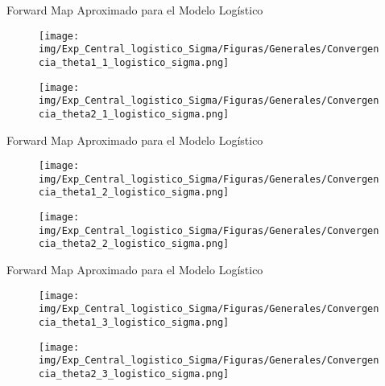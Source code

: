 \documentclass[10pt,aspectratio=169]{beamer}
\begin{document}
\begin{frame}{Forward Map Aproximado para el Modelo Logístico}
  \begin{figure}[H] 
    \centering 
    \texttt{[image: img/Exp\_Central\_logistico\_Sigma/Figuras/Generales/Convergencia\_theta1\_1\_logistico\_sigma.png]} 
  \end{figure} 
  \begin{figure}[H] 
    \centering 
    \texttt{[image: img/Exp\_Central\_logistico\_Sigma/Figuras/Generales/Convergencia\_theta2\_1\_logistico\_sigma.png]} 
    \label{Fig. Aprox log 3v}
  \end{figure} 
\end{frame}


\begin{frame}{Forward Map Aproximado para el Modelo Logístico}
  \begin{figure}[H] 
    \centering 
    \texttt{[image: img/Exp\_Central\_logistico\_Sigma/Figuras/Generales/Convergencia\_theta1\_2\_logistico\_sigma.png]} 
  \end{figure} 
  \begin{figure}[H] 
    \centering 
    \texttt{[image: img/Exp\_Central\_logistico\_Sigma/Figuras/Generales/Convergencia\_theta2\_2\_logistico\_sigma.png]} 
    \label{Fig. Aprox log 5v}
  \end{figure} 
\end{frame}


\begin{frame}{Forward Map Aproximado para el Modelo Logístico}
  \begin{figure}[H] 
    \centering 
    \texttt{[image: img/Exp\_Central\_logistico\_Sigma/Figuras/Generales/Convergencia\_theta1\_3\_logistico\_sigma.png]} 
\end{figure} 
\begin{figure}[H] 
  \centering 
  \texttt{[image: img/Exp\_Central\_logistico\_Sigma/Figuras/Generales/Convergencia\_theta2\_3\_logistico\_sigma.png]} 
  \label{Fig. Aprox log 8v}
  \end{figure} 
\end{frame}
\end{document}
